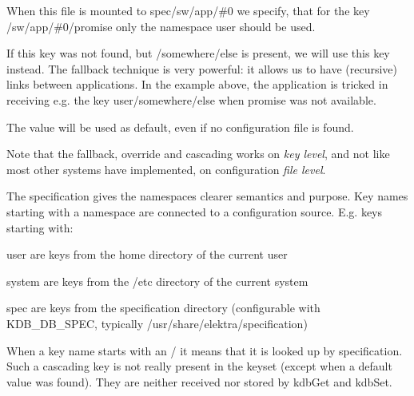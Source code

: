 \begin{DoxyCode}{0}
\DoxyCodeLine{[promise]}
\end{DoxyCode}



\begin{DoxyEnumerate}
\item When this file is mounted to {\ttfamily spec/sw/app/\#0} we specify, that for the key {\ttfamily /sw/app/\#0/promise} only the namespace {\ttfamily user} should be used.
\item If this key was not found, but {\ttfamily /somewhere/else} is present, we will use this key instead. The {\ttfamily fallback} technique is very powerful\+: it allows us to have (recursive) links between applications. In the example above, the application is tricked in receiving e.\+g. the key {\ttfamily user/somewhere/else} when {\ttfamily promise} was not available.
\item The value {} will be used as default, even if no configuration file is found.
\end{DoxyEnumerate}

Note that the fallback, override and cascading works on {\itshape key level}, and not like most other systems have implemented, on configuration {\itshape file level}.

The specification gives the namespaces clearer semantics and purpose. Key names starting with a namespace are connected to a configuration source. E.\+g. keys starting with\+:


\begin{DoxyItemize}
\item {\ttfamily user} are keys from the home directory of the current user
\item {\ttfamily system} are keys from the {\ttfamily /etc} directory of the current system
\item {\ttfamily spec} are keys from the specification directory (configurable with {\ttfamily K\+D\+B\+\_\+\+D\+B\+\_\+\+S\+P\+EC}, typically {\ttfamily /usr/share/elektra/specification})
\end{DoxyItemize}

When a key name starts with an {\ttfamily /} it means that it is looked up by specification. Such a cascading key is not really present in the keyset (except when a default value was found). They are neither received nor stored by {\ttfamily kdb\+Get} and {\ttfamily kdb\+Set}.

